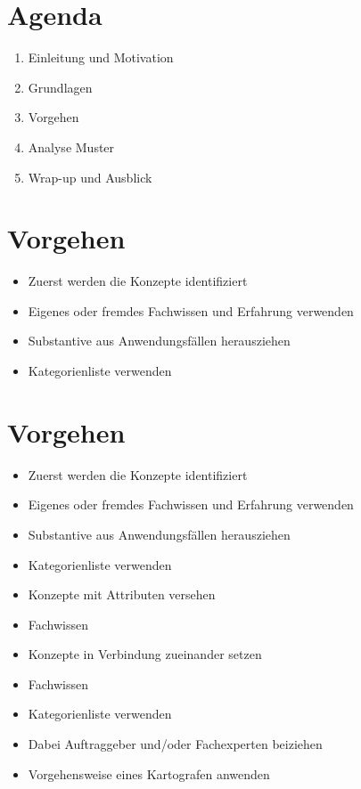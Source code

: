 \documentclass[10pt]{article}
\begin{document}
\section*{Agenda}
\begin{enumerate}
  \item Einleitung und Motivation
  \item Grundlagen
  \item Vorgehen
  \item Analyse Muster
  \item Wrap-up und Ausblick
\end{enumerate}

\section*{Vorgehen}
\begin{itemize}
  \item Zuerst werden die Konzepte identifiziert
  \item Eigenes oder fremdes Fachwissen und Erfahrung verwenden
  \item Substantive aus Anwendungsfällen herausziehen
  \item Kategorienliste verwenden
\end{itemize}

\section*{Vorgehen}
\begin{itemize}
  \item Zuerst werden die Konzepte identifiziert
  \item Eigenes oder fremdes Fachwissen und Erfahrung verwenden
  \item Substantive aus Anwendungsfällen herausziehen
  \item Kategorienliste verwenden
  \item Konzepte mit Attributen versehen
  \item Fachwissen
  \item Konzepte in Verbindung zueinander setzen
  \item Fachwissen
  \item Kategorienliste verwenden
  \item Dabei Auftraggeber und/oder Fachexperten beiziehen
  \item Vorgehensweise eines Kartografen anwenden
\end{itemize}
\end{document}
